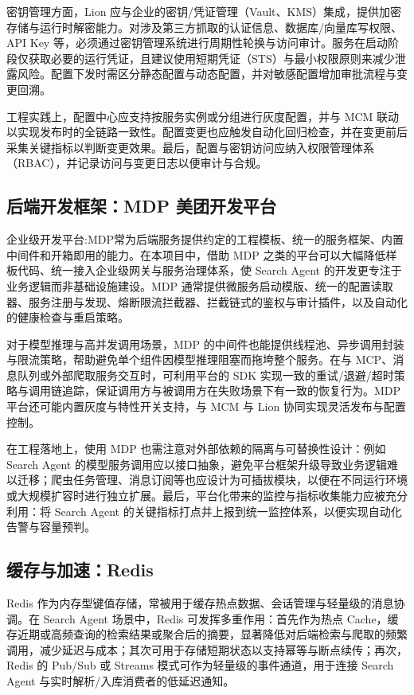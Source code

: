 密钥管理方面，Lion 应与企业的密钥/凭证管理（Vault、KMS）集成，提供加密存储与运行时解密能力。对涉及第三方抓取的认证信息、数据库/向量库写权限、API Key 等，必须通过密钥管理系统进行周期性轮换与访问审计。服务在启动阶段仅获取必要的运行凭证，且建议使用短期凭证（STS）与最小权限原则来减少泄露风险。配置下发时需区分静态配置与动态配置，并对敏感配置增加审批流程与变更回溯。

工程实践上，配置中心应支持按服务实例或分组进行灰度配置，并与 MCM 联动以实现发布时的全链路一致性。配置变更也应触发自动化回归检查，并在变更前后采集关键指标以判断变更效果。最后，配置与密钥访问应纳入权限管理体系（RBAC），并记录访问与变更日志以便审计与合规。

\subsection{后端开发框架：MDP 美团开发平台}
企业级开发平台:MDP\cite{Meituan2018MDP}常为后端服务提供约定的工程模板、统一的服务框架、内置中间件和开箱即用的能力。在本项目中，借助 MDP 之类的平台可以大幅降低样板代码、统一接入企业级网关与服务治理体系，使 Search Agent 的开发更专注于业务逻辑而非基础设施建设。MDP 通常提供微服务启动模版、统一的配置读取器、服务注册与发现、熔断限流拦截器、拦截链式的鉴权与审计插件，以及自动化的健康检查与重启策略。

对于模型推理与高并发调用场景，MDP 的中间件也能提供线程池、异步调用封装与限流策略，帮助避免单个组件因模型推理阻塞而拖垮整个服务。在与 MCP、消息队列或外部爬取服务交互时，可利用平台的 SDK 实现一致的重试/退避/超时策略与调用链追踪，保证调用方与被调用方在失败场景下有一致的恢复行为。MDP 平台还可能内置灰度与特性开关支持，与 MCM 与 Lion 协同实现灵活发布与配置控制。

在工程落地上，使用 MDP 也需注意对外部依赖的隔离与可替换性设计：例如 Search Agent 的模型服务调用应以接口抽象，避免平台框架升级导致业务逻辑难以迁移；爬虫任务管理、消息订阅等也应设计为可插拔模块，以便在不同运行环境或大规模扩容时进行独立扩展。最后，平台化带来的监控与指标收集能力应被充分利用：将 Search Agent 的关键指标打点并上报到统一监控体系，以便实现自动化告警与容量预判。

\subsection{缓存与加速：Redis}
Redis\cite{Rosenschoeld2025Redis} 作为内存型键值存储，常被用于缓存热点数据、会话管理与轻量级的消息协调。在 Search Agent 场景中，Redis 可发挥多重作用：首先作为热点 Cache，缓存近期或高频查询的检索结果或聚合后的摘要，显著降低对后端检索与爬取的频繁调用，减少延迟与成本；其次可用于存储短期状态以支持幂等与断点续传；再次，Redis 的 Pub/Sub 或 Streams 模式可作为轻量级的事件通道，用于连接 Search Agent 与实时解析/入库消费者的低延迟通知。

